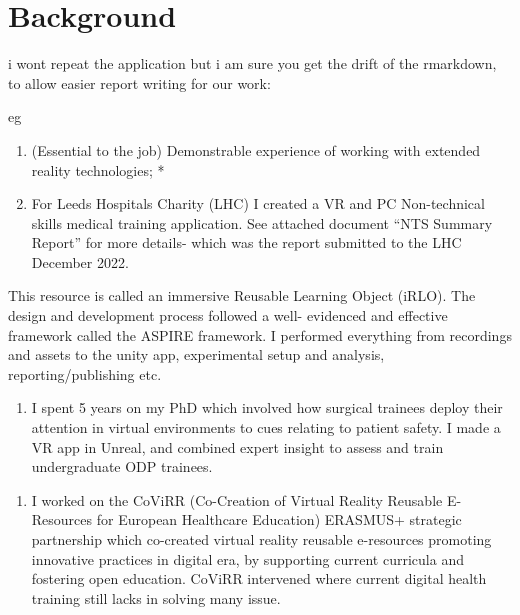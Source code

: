 \documentclass[a4paper, nobind]{templates/ociamthesis}
\providecommand{\tightlist}{%
  \setlength{\itemsep}{0pt}\setlength{\parskip}{0pt}}
\begin{document}
\adjustmtc
{}

\hypertarget{sec-background}{%
\section*{Background}\label{sec-background}}

i wont repeat the application but i am sure you get the drift of the rmarkdown, to allow easier report writing for our work:

eg

\begin{enumerate}
\def\labelenumi{\arabic{enumi}.}
\item
  (Essential to the job)
  Demonstrable experience of working with extended reality technologies; *
\item
  For Leeds Hospitals Charity (LHC) I created a VR and PC Non-technical skills medical training application. See attached document ``NTS Summary Report'' for more details- which was the report submitted to the LHC December 2022.
\end{enumerate}

This resource is called an immersive Reusable Learning Object (iRLO). The design and development process followed a well- evidenced and effective framework called the ASPIRE framework. I performed everything from recordings and assets to the unity app, experimental setup and analysis, reporting/publishing etc.

\begin{enumerate}
\def\labelenumi{\arabic{enumi}.}
\setcounter{enumi}{1}
\tightlist
\item
  I spent 5 years on my PhD which involved how surgical trainees deploy their attention in virtual environments to cues relating to patient safety. I made a VR app in Unreal, and combined expert insight to assess and train undergraduate ODP trainees.
\end{enumerate}

\begin{enumerate}
\def\labelenumi{\arabic{enumi}.}
\setcounter{enumi}{2}
\tightlist
\item
  I worked on the CoViRR (Co-Creation of Virtual Reality Reusable E-Resources for European Healthcare Education) ERASMUS+ strategic partnership which co-created virtual reality reusable e-resources promoting innovative practices in digital era, by supporting current curricula and fostering open education. CoViRR intervened where current digital health training still lacks in solving many issue.
\end{enumerate}
\end{document}

